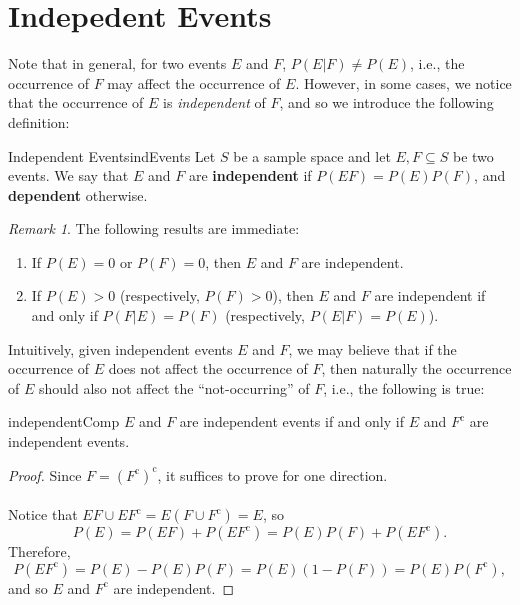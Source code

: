 \documentclass[math]{amznotes}
\theoremstyle{remark}
\newtheorem*{remark}{Remark}
\begin{document}
\section{Indepedent Events}
Note that in general, for two events $E$ and $F$, $P(E|F) \neq P(E)$, i.e., the occurrence of $F$ may affect the occurrence of $E$. However, in some cases, we notice that the occurrence of $E$ is \textit{independent} of $F$, and so we introduce the following definition:
\begin{dfnbox}{Independent Events}{indEvents}
    Let $S$ be a sample space and let $E, F \subseteq S$ be two events. We say that $E$ and $F$ are {\color{red} \textbf{independent}} if $P(EF) = P(E)P(F)$, and {\color{red} \textbf{dependent}} otherwise.
\end{dfnbox}
\begin{notebox}
    \begin{remark}
        The following results are immediate:
        \begin{enumerate}
            \item If $P(E) = 0$ or $P(F) = 0$, then $E$ and $F$ are independent.
            \item If $P(E) > 0$ (respectively, $P(F) > 0$), then $E$ and $F$ are independent if and only if $P(F|E) = P(F)$ (respectively, $P(E|F) = P(E)$).
        \end{enumerate}
    \end{remark}
\end{notebox}
Intuitively, given independent events $E$ and $F$, we may believe that if the occurrence of $E$ does not affect the occurrence of $F$, then naturally the occurrence of $E$ should also not affect the ``not-occurring'' of $F$, i.e., the following is true:
\begin{probox}{}{independentComp}
    $E$ and $F$ are independent events if and only if $E$ and $F^{\mathrm{c}}$ are independent events.
    \tcblower
    \begin{proof}
        Since $F = \left(F^{\mathrm{c}}\right)^{\mathrm{c}}$, it suffices to prove for one direction. 
        \\\\
        Notice that $EF \cup EF^{\mathrm{c}} = E(F \cup F^{\mathrm{c}}) = E$, so
        \begin{equation*}
            P(E) = P(EF) + P(EF^{\mathrm{c}}) = P(E)P(F) + P(EF^{\mathrm{c}}).
        \end{equation*}
        Therefore,
        \begin{equation*}
            P(EF^{\mathrm{c}}) = P(E) - P(E)P(F) = P(E)(1 - P(F)) = P(E)P(F^{\mathrm{c}}),
        \end{equation*}
        and so $E$ and $F^{\mathrm{c}}$ are independent.
    \end{proof}
\end{probox} 
\end{document}
